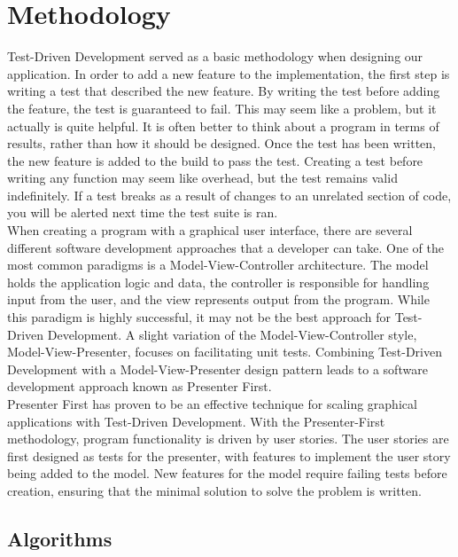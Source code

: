 \documentclass{bioinfo}
\begin{document}
\section{Methodology}

Test-Driven Development served as a basic methodology when designing our application. In order to add a new feature to the implementation, the first step is writing a test that described the new feature. By writing the test before adding the feature, the test is guaranteed to fail. This may seem like a problem, but it actually is quite helpful. It is often better to think about a program in terms of results, rather than how it should be designed. Once the test has been written, the new feature is added to the build to pass the test. Creating a test before writing any function may seem like overhead, but the test remains valid indefinitely. If a test breaks as a result of changes to an unrelated section of code, you will be alerted next time the test suite is ran.\\

When creating a program with a graphical user interface, there are
several different software development approaches that a developer can
take. One of the most common paradigms is a Model-View-Controller
architecture. The model holds the application logic and data, the
controller is responsible for handling input from the user, and the
view represents output from the program. While this paradigm is highly
successful, it may not be the best approach for Test-Driven
Development. A slight variation of the Model-View-Controller style,
Model-View-Presenter, focuses on facilitating unit tests. Combining
Test-Driven Development with a Model-View-Presenter design pattern
leads to a software development approach known as Presenter First. \citep{Alles:2006:PFO:1155439.1155482}\\

Presenter First has proven to be an effective technique for scaling graphical applications with Test-Driven Development. With the Presenter-First methodology, program functionality is driven by user stories. The user stories are first designed as tests for the presenter, with features to implement the user story being added to the model. New features for the model require failing tests before creation, ensuring that the minimal solution to solve the problem is written.

\subsection{Algorithms}
\end{document}
